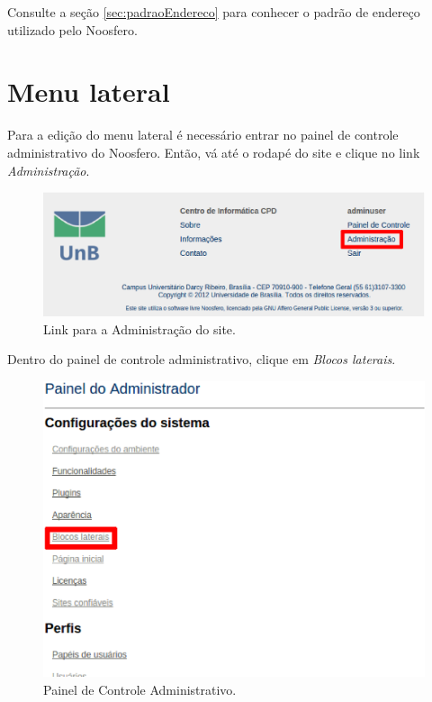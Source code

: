 Consulte a seção \ref{sec:padraoEndereco} para conhecer o padrão de endereço utilizado pelo Noosfero.

\section{Menu lateral}

Para a edição do menu lateral é necessário entrar no painel de controle administrativo do Noosfero. Então, vá até o rodapé do site e clique no link \emph{\color{red}Administração}.

\begin{figure}[h]
     \centering
       \includegraphics[keepaspectratio=true,scale=0.6]{figuras/linkAdmin.eps}
     \caption{Link para a Administração do site.}
     \label{fig:linkAdmin}
\end{figure}

\newpage
Dentro do painel de controle administrativo, clique em \emph{\color{red}Blocos laterais}.

\begin{figure}[h]
     \centering
       \includegraphics[keepaspectratio=true,scale=0.4]{figuras/administracao.eps}
     \caption{Painel de Controle Administrativo.}
     \label{fig:painelAdministrativo}
\end{figure}

